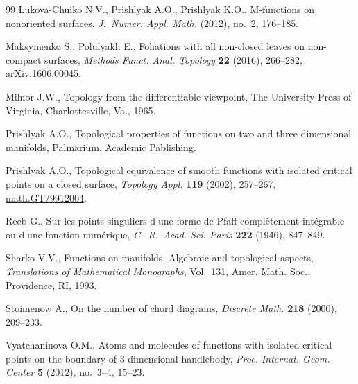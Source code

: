 \begin{thebibliography}{99}
Lukova-Chuiko N.V., Prishlyak A.O., Prishlyak K.O., M-functions on nonoriented
 surfaces, \textit{J.~Numer. Appl. Math.} (2012), no.~2, 176--185.

Maksymenko S., Polulyakh E., Foliations with all non-closed leaves on
 non-compact surfaces, \textit{Methods Funct. Anal. Topology} \textbf{22}
 (2016), 266--282, \href{https://arxiv.org/abs/1606.00045}{arXiv:1606.00045}.

Milnor J.W., Topology from the dif\/ferentiable viewpoint, The University Press
 of Virginia, Charlottesville, Va., 1965.

Prishlyak A.O., Topological properties of functions on two and three
 dimensional manifolds, Palmarium. Academic Pablishing.

Prishlyak A.O., Topological equivalence of smooth functions with isolated
 critical points on a closed surface, \href{https://doi.org/10.1016/S0166-8641(01)00077-3}{\textit{Topology Appl.}} \textbf{119}
 (2002), 257--267, \href{https://arxiv.org/abs/math.GT/9912004}{math.GT/9912004}.

Reeb G., Sur les points singuliers d'une forme de {P}faf\/f compl\`etement
 int\'egrable ou d'une fonction num\'erique, \textit{C.~R.~Acad. Sci. Paris}
 \textbf{222} (1946), 847--849.

Sharko V.V., Functions on manifolds. Algebraic and topological aspects,
 \textit{Translations of Mathematical Monographs}, Vol.~131, Amer. Math. Soc.,
 Providence, RI, 1993.

Stoimenow A., On the number of chord diagrams, \href{https://doi.org/10.1016/S0012-365X(99)00347-7}{\textit{Discrete Math.}}
 \textbf{218} (2000), 209--233.

Vyatchaninova O.M., Atoms and molecules of functions with isolated critical
 points on the boundary of 3-dimensional handlebody, \textit{Proc. Internat.
 Geom. Center} \textbf{5} (2012), no.~3--4, 15--23.

\end{thebibliography}
